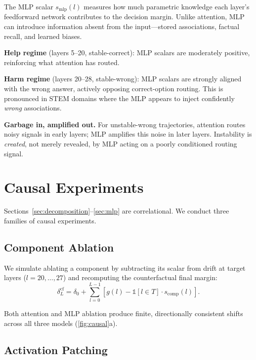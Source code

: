 \documentclass{article}
\begin{document}
The MLP scalar $s_{\mathrm{mlp}}(l)$ measures how much parametric knowledge each layer's feedforward network contributes to the decision margin.  Unlike attention, MLP can introduce information absent from the input---stored associations, factual recall, and learned biases.

\textbf{Help regime} (layers 5--20, stable-correct): MLP scalars are moderately positive, reinforcing what attention has routed.

\textbf{Harm regime} (layers 20--28, stable-wrong): MLP scalars are strongly aligned with the wrong answer, actively opposing correct-option routing.  This is pronounced in STEM domains where the MLP appears to inject confidently \emph{wrong} associations.

\textbf{Garbage in, amplified out.}  For unstable-wrong trajectories, attention routes noisy signals in early layers; MLP amplifies this noise in later layers.  Instability is \emph{created}, not merely revealed, by MLP acting on a poorly conditioned routing signal.


\section{Causal Experiments}
\label{sec:causal}

Sections~\ref{sec:decomposition}--\ref{sec:mlp} are correlational.  We conduct three families of causal experiments.

\subsection{Component Ablation}

We simulate ablating a component by subtracting its scalar from drift at target layers ($l = 20,\ldots,27$) and recomputing the counterfactual final margin:
\begin{equation}
  \delta^{\mathrm{cf}}_L = \delta_0 + \sum_{l=0}^{L-1}\! \left[g(l) - \mathbb{1}[l \in T]\cdot s_{\mathrm{comp}}(l)\right]\!.
  \label{eq:ablation}
\end{equation}

Both attention and MLP ablation produce finite, directionally consistent shifts across all three models (\cref{fig:causal}a).

\subsection{Activation Patching}
\end{document}
